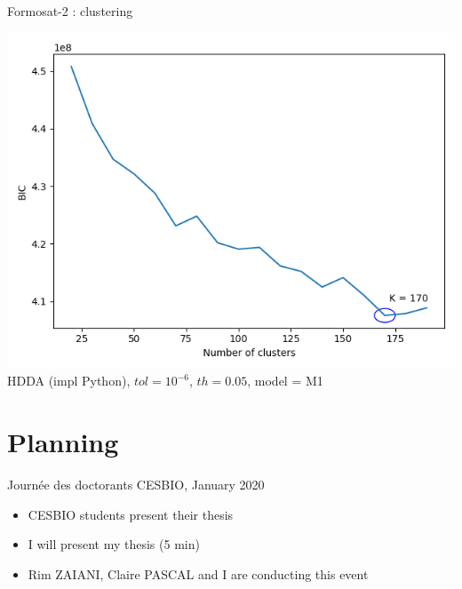 \documentclass[aspectratio=1610,usenames,dvipsnames]{beamer}
\begin{document}
\begin{frame}{Formosat-2 : clustering}
    \begin{center}
    \includegraphics[height=0.7\textheight]{img/clust_formosat.png}\\
    HDDA (impl Python), $tol=10^{-6}$, $th = 0.05$, model = M1
    \end{center}
    
    
\end{frame}

\section{Planning}


\begin{frame}{Journée des doctorants CESBIO, January 2020}
    \begin{itemize}
        \item CESBIO students present their thesis
        \item I will present my thesis (5 min)
        \item Rim ZAIANI, Claire PASCAL and I are conducting this event
    \end{itemize}
\end{frame}
\end{document}
